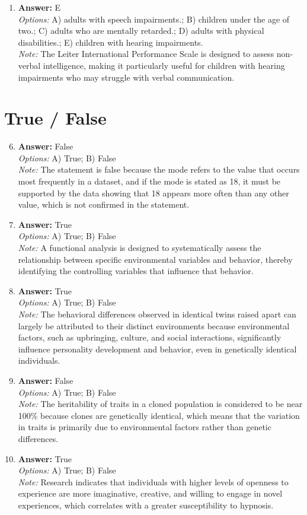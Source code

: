 \documentclass[12pt]{article}
\begin{document}
\begin{enumerate}[label=\arabic*.]
\item \textbf{Answer:} E
\\ \textit{Options:} A) adults with speech impairments.; B) children under the age of two.; C) adults who are mentally retarded.; D) adults with physical disabilities.; E) children with hearing impairments.
\\ \textit{Note:} The Leiter International Performance Scale is designed to assess non-verbal intelligence, making it particularly useful for children with hearing impairments who may struggle with verbal communication.
\end{enumerate}

\section*{True / False}
\begin{enumerate}[label=\arabic*.]
\setcounter{enumi}{5}
\item \textbf{Answer:} False
\\ \textit{Options:} A) True; B) False
\\ \textit{Note:} The statement is false because the mode refers to the value that occurs most frequently in a dataset, and if the mode is stated as 18, it must be supported by the data showing that 18 appears more often than any other value, which is not confirmed in the statement.
\item \textbf{Answer:} True
\\ \textit{Options:} A) True; B) False
\\ \textit{Note:} A functional analysis is designed to systematically assess the relationship between specific environmental variables and behavior, thereby identifying the controlling variables that influence that behavior.
\item \textbf{Answer:} True
\\ \textit{Options:} A) True; B) False
\\ \textit{Note:} The behavioral differences observed in identical twins raised apart can largely be attributed to their distinct environments because environmental factors, such as upbringing, culture, and social interactions, significantly influence personality development and behavior, even in genetically identical individuals.
\item \textbf{Answer:} False
\\ \textit{Options:} A) True; B) False
\\ \textit{Note:} The heritability of traits in a cloned population is considered to be near 100\% because clones are genetically identical, which means that the variation in traits is primarily due to environmental factors rather than genetic differences.
\item \textbf{Answer:} True
\\ \textit{Options:} A) True; B) False
\\ \textit{Note:} Research indicates that individuals with higher levels of openness to experience are more imaginative, creative, and willing to engage in novel experiences, which correlates with a greater susceptibility to hypnosis.
\end{enumerate}
\end{document}
